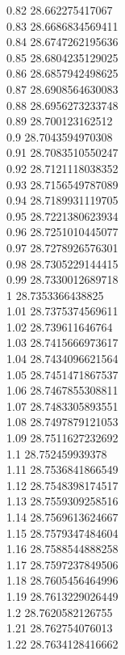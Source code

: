 {0.82	28.662275417067\\
0.83	28.6686834569411\\
0.84	28.6747262195636\\
0.85	28.6804235129025\\
0.86	28.6857942498625\\
0.87	28.6908564630083\\
0.88	28.6956273233748\\
0.89	28.700123162512\\
0.9	28.7043594970308\\
0.91	28.7083510550247\\
0.92	28.7121118038352\\
0.93	28.7156549787089\\
0.94	28.7189931119705\\
0.95	28.7221380623934\\
0.96	28.7251010445077\\
0.97	28.7278926576301\\
0.98	28.7305229144415\\
0.99	28.7330012689718\\
1	28.7353366438825\\
1.01	28.7375374569611\\
1.02	28.739611646764\\
1.03	28.7415666973617\\
1.04	28.7434096621564\\
1.05	28.7451471867537\\
1.06	28.7467855308811\\
1.07	28.7483305893551\\
1.08	28.7497879121053\\
1.09	28.7511627232692\\
1.1	28.752459939378\\
1.11	28.7536841866549\\
1.12	28.7548398174517\\
1.13	28.7559309258516\\
1.14	28.7569613624667\\
1.15	28.7579347484604\\
1.16	28.7588544888258\\
1.17	28.7597237849506\\
1.18	28.7605456464996\\
1.19	28.7613229026449\\
1.2	28.7620582126755\\
1.21	28.762754076013\\
1.22	28.7634128416662\\
}
